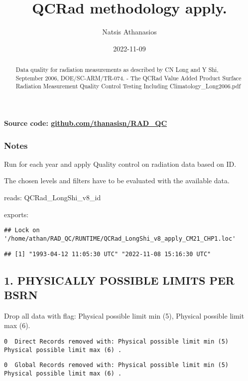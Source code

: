 \documentclass[
  10pt,
  a4paper,oneside]{article}
\title{QCRad methodology apply.}
\author{Natsis Athanasios}
\date{2022-11-09}
\begin{document}
\maketitle
\begin{abstract}
Data quality for radiation measurements as described by CN Long and Y Shi, September 2006, DOE/SC-ARM/TR-074. - The QCRad Value Added Product Surface Radiation Measurement Quality Control Testing Including Climatology\_Long2006.pdf
\end{abstract}

{
\hypersetup{linkcolor=}
\setcounter{tocdepth}{2}
\tableofcontents
}
\textbf{Source code: \href{https://github.com/thanasisn/RAD_QC}{github.com/thanasisn/RAD\_QC}}

\hypertarget{notes}{%
\subsubsection{Notes}\label{notes}}

Run for each year and apply Quality control on radiation data based on ID.

The chosen levels and filters have to be evaluated with the available data.

reads: QCRad\_LongShi\_v8\_id

exports:

\begin{verbatim}
## Lock on '/home/athan/RAD_QC/RUNTIME/QCRad_LongShi_v8_apply_CM21_CHP1.loc'
\end{verbatim}

\begin{verbatim}
## [1] "1993-04-12 11:05:30 UTC" "2022-11-08 15:16:30 UTC"
\end{verbatim}

\newpage

\hypertarget{physically-possible-limits-per-bsrn}{%
\subsection{1. PHYSICALLY POSSIBLE LIMITS PER BSRN}\label{physically-possible-limits-per-bsrn}}

Drop all data with flag: Physical possible limit min (5), Physical possible limit max (6).

\begin{verbatim}
0  Direct Records removed with: Physical possible limit min (5) Physical possible limit max (6) .
\end{verbatim}

\begin{verbatim}
0  Global Records removed with: Physical possible limit min (5) Physical possible limit max (6) .
\end{verbatim}
\end{document}
